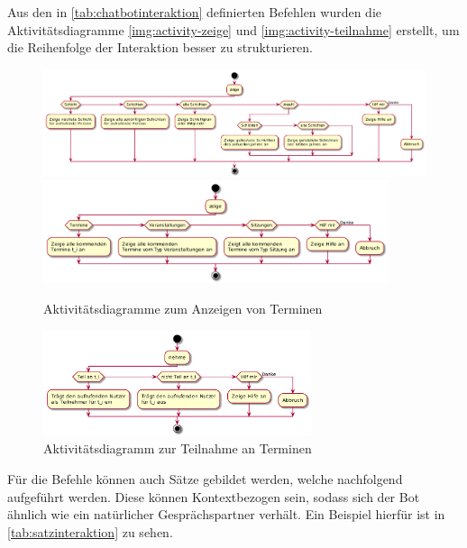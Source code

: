 Aus den in \autoref{tab:chatbotinteraktion} definierten Befehlen wurden die Aktivitätsdiagramme \autoref{img:activity-zeige} und \autoref{img:activity-teilnahme} erstellt, um die Reihenfolge der Interaktion besser zu strukturieren.

\begin{figure}[htbp]
    \centering
    \includegraphics[width=\textwidth]{../docs/uml/activity-zeige.png}
    \includegraphics[width=0.9\textwidth]{../docs/uml/activity-zeige2.png}
    \caption{Aktivitätsdiagramme zum Anzeigen von Terminen}
    \label{img:activity-zeige}
\end{figure}

\begin{figure}[htbp]
    \centering
    \includegraphics[width=0.7\textwidth]{../docs/uml/activity-teilnahme.png}
    \caption{Aktivitätsdiagramm zur Teilnahme an Terminen}
    \label{img:activity-teilnahme}
\end{figure}


Für die Befehle können auch Sätze gebildet werden, welche nachfolgend aufgeführt werden. Diese können Kontextbezogen sein, sodass sich der Bot ähnlich wie ein natürlicher Gesprächspartner verhält. Ein Beispiel hierfür ist in \autoref{tab:satzinteraktion} zu sehen.

